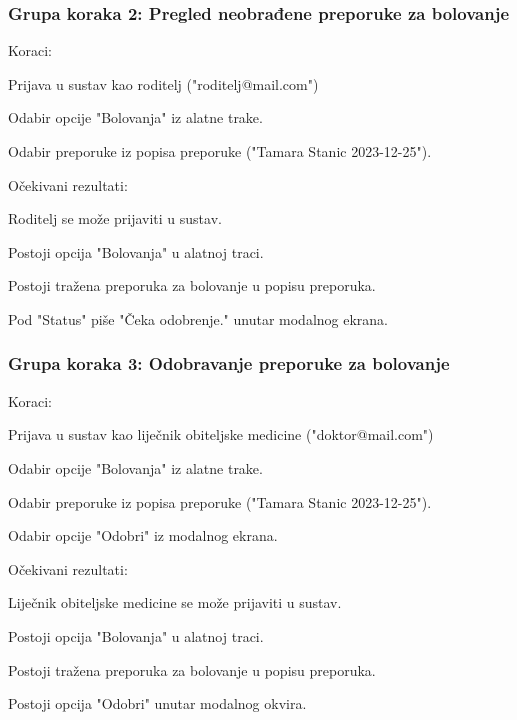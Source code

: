 			 \subsubsection*{Grupa koraka 2: Pregled neobrađene preporuke za bolovanje}
			 Koraci:
			 \begin{packed_enum}
				\item Prijava u sustav kao roditelj ("roditelj@mail.com")
				\item Odabir opcije "Bolovanja" iz alatne trake.
				\item Odabir preporuke iz popisa preporuke ("Tamara Stanic 2023-12-25").
			 \end{packed_enum}
			 Očekivani rezultati:
			 \begin{packed_enum}
				\item Roditelj se može prijaviti u sustav.
				\item Postoji opcija "Bolovanja" u alatnoj traci.
				\item Postoji tražena preporuka za bolovanje u popisu preporuka.
				\item Pod "Status" piše "Čeka odobrenje." unutar modalnog ekrana.
			 \end{packed_enum}

			 \subsubsection*{Grupa koraka 3: Odobravanje preporuke za bolovanje}
			 Koraci:
			 \begin{packed_enum}
				\item Prijava u sustav kao liječnik obiteljske medicine ("doktor@mail.com")
				\item Odabir opcije "Bolovanja" iz alatne trake.
				\item Odabir preporuke iz popisa preporuke ("Tamara Stanic 2023-12-25").
				\item Odabir opcije "Odobri" iz modalnog ekrana.
			 \end{packed_enum}
			 Očekivani rezultati:
			 \begin{packed_enum}
				\item Liječnik obiteljske medicine se može prijaviti u sustav.
				\item Postoji opcija "Bolovanja" u alatnoj traci.
				\item Postoji tražena preporuka za bolovanje u popisu preporuka.
				\item Postoji opcija "Odobri" unutar modalnog okvira.
			 \end{packed_enum}

